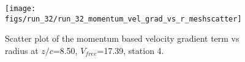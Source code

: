 \begin{figure}[H]
\centering
\texttt{[image: figs/run\_32/run\_32\_momentum\_vel\_grad\_vs\_r\_meshscatter]}
\caption{Scatter plot of the momentum based velocity gradient term vs radius at $z/c$=8.50, $V_{free}$=17.39, station 4.}
\label{fig:run_32_momentum_vel_grad_vs_r_meshscatter}
\end{figure}


